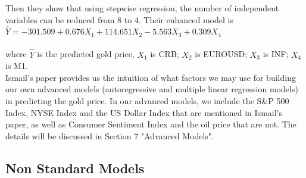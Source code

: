 \documentclass[runningheads]{llncs}
\begin{document}
\noindent Then they show that using stepwise regression, the number of independent variables can be reduced from 8 to 4. Their enhanced model is  \\

$\hat{Y}=-301.509+0.676X_1+114.651X_2-5.563X_3+0.309X_4$ \\\\
where $\hat{Y}$ is the predicted gold price, $X_1$ is CRB; $X_2$ is EUROUSD; $X_3$ is INF; $X_4$ is M1. \\

\noindent Ismail's paper provides us the intuition of what factors we may use for building our own advanced models (autoregressive and multiple linear regression models) in predicting the gold price. In our advanced models, we include the S\&P 500 Index, NYSE Index and the US Dollar Index that are mentioned in Ismail's paper, as well as Consumer Sentiment Index and the oil price that are not. The details will be discussed in Section 7 "Advanced Models".\\

\subsection{Non Standard Models}
\end{document}
